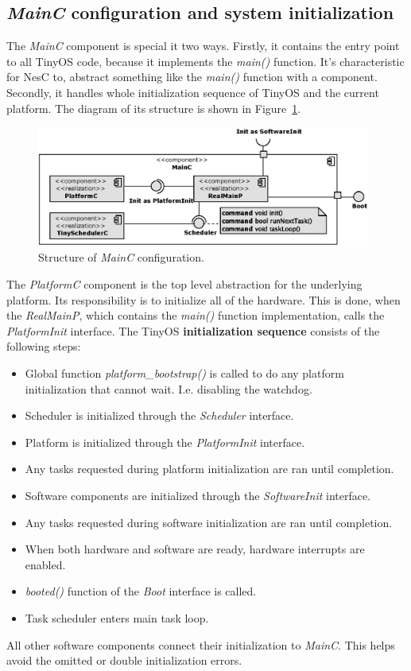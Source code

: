 \subsection{\emph{MainC} configuration and system initialization}

The \emph{MainC} component is special it two ways. Firstly, it
contains the entry point to all TinyOS code, because it implements the
\emph{main()} function. It's characteristic for NesC to, abstract
something like the \emph{main()} function with a component. Secondly,
it handles whole initialization sequence of TinyOS and the current
platform. The diagram of its structure is shown in
Figure~\ref{fig:mainc}.
\begin{figure}[h]
  \centering
  \includegraphics[width=0.98\textwidth]{diagrams/mainc.eps}
  \caption{Structure of \emph{MainC} configuration.}
  \label{fig:mainc}
\end{figure}
The \emph{PlatformC} component is the top level abstraction for the
underlying platform. Its responsibility is to initialize all of the
hardware. This is done, when the \emph{RealMainP}, which contains the
\emph{main()} function implementation, calls the \emph{PlatformInit}
interface. The TinyOS {\bf initialization sequence} consists of the
following steps:
\begin{itemize}
  \item Global function \emph{platform\_bootstrap()} is called to do
    any platform initialization that cannot wait. I.e. disabling the
    watchdog.
  \item Scheduler is initialized through the \emph{Scheduler} interface.
  \item Platform is initialized through the \emph{PlatformInit} interface.
  \item Any tasks requested during platform initialization are ran
    until completion.
  \item Software components are initialized through the
    \emph{SoftwareInit} interface.
  \item Any tasks requested during software initialization are ran
    until completion.
  \item When both hardware and software are ready, hardware interrupts
    are enabled.
  \item \emph{booted()} function of the \emph{Boot} interface is
    called.
  \item Task scheduler enters main task loop.
\end{itemize}
All other software components connect their initialization to
\emph{MainC}. This helps avoid the omitted or double initialization
errors.


\label{haa_arch} %




